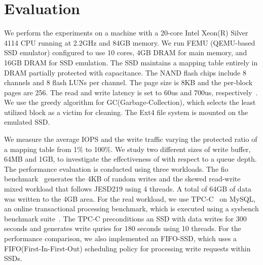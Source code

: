 \section{Evaluation}
We perform the experiments on a machine with a 20-core Intel Xeon(R) Silver
4114 CPU running at 2.2GHz and 84GB memory. We run FEMU (QEMU-based SSD
emulator) configured to use 10 cores, 4GB DRAM for main memory, and 16GB DRAM
for SSD emulation. The SSD maintains a mapping table entirely in DRAM partially
protected with capacitance. The NAND flash chips include 8 channels and 8 flash
LUNs per channel. The page size is 8KB and the per-block pages are 256. The
read and write latency is set to 60us and 700us,
respectively~\cite{cheong2018flash}. We use the greedy algorithm for
GC(Garbage-Collection), which selects the least utilized block as a victim for
cleaning. The Ext4 file system is mounted on the emulated SSD.  

We measure the average IOPS and the write traffic varying the protected ratio
of a mapping table from 1\% to 100\%. We study two different sizes of write
buffer, 64MB and 1GB, to investigate the effectiveness of \ours{} with respect
to a queue depth. The performance evaluation is conducted using three workloads.
The fio benchmark~\cite{fio-bench} generates the 4KB of random writes and the
skewed read-write mixed workload that follows JESD219 using 4 threads. A
total of 64GB of data was written to the 4GB area. For the real workload, we use 
TPC-C~\cite{council1990tpc} on MySQL, an online transactional processing benchmark, 
which is executed using a sysbench benchmark suite~\cite{sysbench}.
The TPC-C preconditions an SSD with data writes for 300 seconds and generates  
write quries for 180 seconds using 10 threads.
For the performance comparison, we also implemented an FIFO-SSD, which uses 
a FIFO(First-In-First-Out) scheduling policy for processing write requests within SSDs. 

